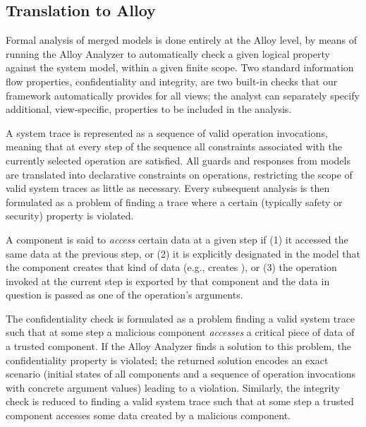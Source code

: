 \subsection{Translation to Alloy}
\label{sec-impl-alloy}

Formal analysis of merged models is done entirely at the Alloy level,
by means of running the Alloy Analyzer to automatically check a given
logical property against the system model, within a given finite
scope.  Two standard information flow properties, confidentiality and
integrity, are two built-in checks that our framework automatically
provides for all views; the analyst can separately specify additional,
view-specific, properties to be included in the analysis.

A system trace is represented as a sequence of valid operation
invocations, meaning that at every step of the sequence all
constraints associated with the currently selected operation are
satisfied.  All guards and responses from \sLang models are translated
into declarative constraints on operations, restricting the scope of
valid system traces as little as necessary.  Every subsequent analysis
is then formulated as a problem of finding a trace where a certain
(typically safety or security) property is violated.

A component is said to \textit{access} certain data at a given step if
(1) it accessed the same data at the previous step, or (2) it is
explicitly designated in the model that the component creates that
kind of data (e.g.,  creates ), or (3) the
operation invoked at the current step is exported by that component
and the data in question is passed as one of the operation's
arguments.

The confidentiality check is formulated as a problem finding a valid
system trace such that at some step a malicious component \textit{accesses} a
critical piece of data of a trusted component.  If the Alloy Analyzer
finds a solution to this problem, the confidentiality property is
violated; the returned solution encodes an exact scenario (initial
states of all components and a sequence of operation invocations with
concrete argument values) leading to a violation.  Similarly, the
integrity check is reduced to finding a valid system trace such that
at some step a trusted component accesses some data created by a
malicious component.

